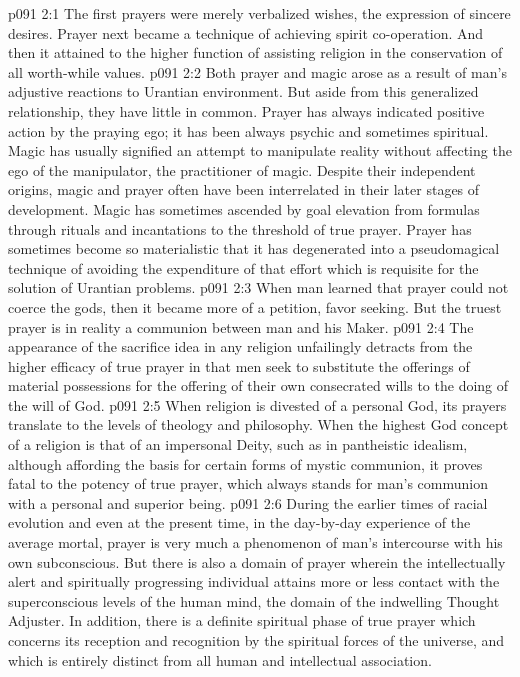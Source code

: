 \vs p091 2:1 The first prayers were merely verbalized wishes, the expression of sincere desires. Prayer next became a technique of achieving spirit co\hyp{}operation. And then it attained to the higher function of assisting religion in the conservation of all worth\hyp{}while values.
\vs p091 2:2 Both prayer and magic arose as a result of man’s adjustive reactions to Urantian environment. But aside from this generalized relationship, they have little in common. Prayer has always indicated positive action by the praying ego; it has been always psychic and sometimes spiritual. Magic has usually signified an attempt to manipulate reality without affecting the ego of the manipulator, the practitioner of magic. Despite their independent origins, magic and prayer often have been interrelated in their later stages of development. Magic has sometimes ascended by goal elevation from formulas through rituals and incantations to the threshold of true prayer. Prayer has sometimes become so materialistic that it has degenerated into a pseudomagical technique of avoiding the expenditure of that effort which is requisite for the solution of Urantian problems.
\pc \vs p091 2:3 When man learned that prayer could not coerce the gods, then it became more of a petition, favor seeking. But the truest prayer is in reality a communion between man and his Maker.
\pc \vs p091 2:4 The appearance of the sacrifice idea in any religion unfailingly detracts from the higher efficacy of true prayer in that men seek to substitute the offerings of material possessions for the offering of their own consecrated wills to the doing of the will of God.
\vs p091 2:5 When religion is divested of a personal God, its prayers translate to the levels of theology and philosophy. When the highest God concept of a religion is that of an impersonal Deity, such as in pantheistic idealism, although affording the basis for certain forms of mystic communion, it proves fatal to the potency of true prayer, which always stands for man’s communion with a personal and superior being.
\vs p091 2:6 During the earlier times of racial evolution and even at the present time, in the day\hyp{}by\hyp{}day experience of the average mortal, prayer is very much a phenomenon of man’s intercourse with his own subconscious. But there is also a domain of prayer wherein the intellectually alert and spiritually progressing individual attains more or less contact with the superconscious levels of the human mind, the domain of the indwelling Thought Adjuster. In addition, there is a definite spiritual phase of true prayer which concerns its reception and recognition by the spiritual forces of the universe, and which is entirely distinct from all human and intellectual association.\plusone
